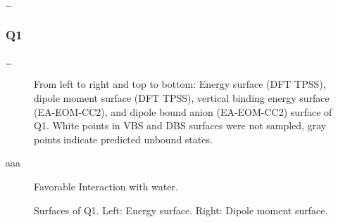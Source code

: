\ldots
\subsubsection{Q1}

\ldots
\begin{figure}[ht!]
  \centering
  \small
  
  \label{fig:Q1_maps}
  \caption[Surfaces of Q1]{From left to right and top to bottom: Energy surface (DFT TPSS), dipole moment surface (DFT TPSS), vertical binding energy surface (EA-EOM-CC2), and dipole bound anion (EA-EOM-CC2) surface of Q1. White points in VBS and DBS surfaces were not sampled, gray points indicate predicted unbound states.}
\end{figure}
aaa
\begin{figure}[th!]
    \centering
    \small
    
    \caption[Short caption for Table of Figures]{Favorable Interaction with water.}
    \label{fig:D_vsDBS}
\end{figure}
\iffalse\begin{figure}[ht!]
  \centering
  \begin{minipage}[]{0.49\textwidth}
    \centering
    \footnotesize
    
  \end{minipage}%
  \begin{minipage}[]{0.47\textwidth}
    \centering
    \small
    
  \end{minipage}
  \begin{minipage}[]{0.49\textwidth}
    \centering
    \small
    
  \end{minipage}%
  \begin{minipage}[]{0.47\textwidth}
    \centering
    \small
    
  \end{minipage}
  \label{fig:Q1_surf}
  \caption[Surfaces of Q1]{Surfaces of Q1. Left: Energy surface. Right: Dipole moment surface.}
\end{figure}\fi

\iffalse\begin{figure}[hb!]
  \centering
  \begin{minipage}[]{0.49\textwidth}
    \centering
    \small
    
  \end{minipage}%
  \begin{minipage}[]{0.47\textwidth}
    \centering
    \small
    
  \end{minipage}
  \label{fig:Q1_surf}
  \caption[Surfaces of Q1]{Surfaces of Q1. Left: Energy surface. Right: Dipole moment surface.}
\end{figure}

